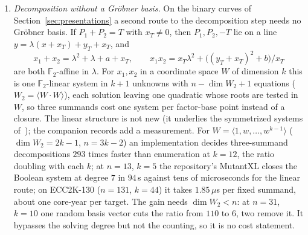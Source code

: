 \documentclass[11pt]{article}
\theoremstyle{definition}\newtheorem{definition}[theorem]{Definition}
\theoremstyle{remark}\newtheorem{remark}[theorem]{Remark}
\newcommand{\F}{\mathbb F}
\begin{document}
\begin{enumerate}
 number of solutions~\cite[Prop.~2.8]{hkyy}. The cost model of
 Section~\ref{sec:meaning} uses relation yield and linear algebra measured
 at $N\le2^{40}$ for $m\le3$; missing are proofs of the yield law,
 measurements for $m\ge4$ and above $2^{40}$, a solver charge that covers the
 split presentation and hybrid methods, and a lower bound for $m\ge3$ that
 grows fast enough in $k$ to matter at the cheapest depths: the proved floor
 keeps the four-summand Macaulay route above rho only up to about $2^{293}$,
 and the growth of Corollary~\ref{cor:growthm}, at slope $1/14$, does not
 change that.
\item \emph{Decomposition without a Gr\"obner basis.} On the binary curves
 of Section~\ref{sec:presentations} a second route to the decomposition step
 needs no Gr\"obner basis. If $P_1+P_2=T$ with $x_T\ne0$, then $P_1,P_2,-T$
 lie on a line $y=\lambda(x+x_T)+y_T+x_T$, and
 \[
 x_1+x_2=\lambda^2+\lambda+a+x_T,\qquad
 x_1x_2=x_T\lambda^2+\bigl((y_T+x_T)^2+b\bigr)/x_T
 \]
 are both $\F_2$-affine in $\lambda$. For $x_1,x_2$ in a coordinate space
 $W$ of dimension $k$ this is one $\F_2$-linear system in $k+1$ unknowns with
 $n-\dim W_2+1$ equations ($W_2=\langle W\cdot W\rangle$), each solution
 leaving one quadratic whose roots are tested in $W$, so three summands cost
 one system per factor-base point instead of a closure. The linear structure
 is not new (it underlies the symmetrized systems of~\cite{fppr}); the
 companion records add a measurement. For $W=\langle1,w,\dots,w^{k-1}\rangle$
 ($\dim W_2=2k-1$, $n=3k-2$) an implementation decides three-summand
 decompositions $293$ times faster than enumeration at $k=12$, the ratio
 doubling with each $k$; at $n=13$, $k=5$ the repository's MutantXL closes
 the Boolean system at degree $7$ in $94$\,s against tens of microseconds for
 the linear route; on ECC2K-130 ($n=131$, $k=44$) it takes $1.85\,\mu$s per
 fixed summand, about one core-year per target. The gain needs $\dim W_2<n$:
 at $n=31$, $k=10$ one random basis vector cuts the ratio from $110$ to $6$,
 two remove it. It bypasses the solving degree but not the counting, so it is
 no cost statement.
\end{enumerate}
\end{document}
